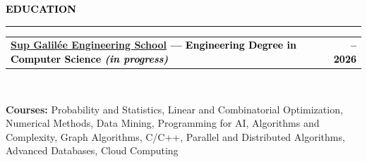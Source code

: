 \documentclass[10pt,english,french]{article}
\makeatletter
\newcommand{\educationIcon}[1][black]{\textcolor{#1}{\faGraduationCap}}
\newlength{\mpwidth}
\newcommand{\cvsection}[1]{
    \vspace{4pt}
    \textbf{\fontsize{9pt}{10pt}\selectfont \textcolor{black}{#1}}
    \vspace{6pt}
    \hrule
    \vspace{6pt}
}
\newcommand{\cvtextnotab}[1]{
    \parbox{1\mpwidth}{#1}
}
\newcommand{\cvevent}[2]{
    \vspace{2pt}
    \parbox{\mpwidth}{
        \begin{tabular*}{1\mpwidth}{@{\extracolsep{\fill}} l r}
            \textcolor{black}{\textbf{\fontsize{11}{12}\selectfont #1}} & \textcolor{black}{\textbf{\fontsize{12}{12}\selectfont #2}} \\
        \end{tabular*}\\[-8pt] %
    }
}
\newcommand{\cvsubevent}[2]{
    \parbox{\mpwidth}{
        \begin{tabular*}{1\mpwidth}{@{\extracolsep{\fill}} l r}
            \textcolor{black}{\textit{\fontsize{10}{12}\selectfont #1}} & \textcolor{black}{\textit{\fontsize{10}{12}\selectfont #2}} \\
        \end{tabular*}\\[-8pt] %
    }
    \vspace{-10pt}
}
\makeatother
\begin{document}

\vspace{-5pt}
\cvsection{\educationIcon[black]\hspace{4pt}EDUCATION}

\vspace{-3pt}
\cvevent{\href{https://www.sup-galilee.univ-paris13.fr/}{Sup Galilée Engineering School} --- Engineering Degree in Computer Science \textit{(in progress)}}{\fontsize{11pt}{11pt}\selectfont 2023\hspace{5pt}--\hspace{5pt}2026}

\vspace{-3pt}
\cvtextnotab{
    \textbf{Courses\!:}
    Probability and Statistics, Linear and Combinatorial Optimization,
    Numerical Methods, Data Mining, Programming for AI,
    Algorithms and Complexity, Graph Algorithms,
    C/C++, Parallel and Distributed Algorithms,
    Advanced Databases, Cloud Computing
}



\end{document}
